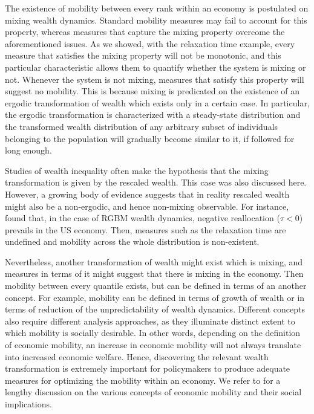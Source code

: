 \documentclass[11pt]{article}
\numberwithin{equation}{section}
\begin{document}
The existence of mobility between every rank within an economy is postulated on mixing wealth dynamics. Standard mobility measures may fail to account for this property, whereas measures that capture the mixing property overcome the aforementioned issues. As we showed, with the relaxation time example, every measure that satisfies the mixing property will not be monotonic, and this particular characteristic allows them to quantify whether the system is mixing or not. Whenever the system is not mixing, measures that satisfy this property will suggest no mobility. This is because mixing is predicated on the existence of an ergodic transformation of wealth which exists only in a certain case. In particular, the ergodic transformation is characterized with a steady-state distribution and the transformed wealth distribution of any arbitrary subset of individuals belonging to the population will gradually become similar to it, if followed for long enough.

Studies of wealth inequality often make the hypothesis that the mixing transformation is given by the rescaled wealth. This case was also discussed here. However, a growing body of evidence suggests that in reality rescaled wealth might also be a non-ergodic, and hence non-mixing observable. For instance, \citet{BermanPetersAdamou2019} found that, in the case of RGBM wealth dynamics, negative reallocation ($\tau < 0$) prevails in the US economy. Then, measures such as the relaxation time are undefined and mobility across the whole distribution is non-existent.
 
Nevertheless, another transformation of wealth might exist which is mixing, and measures in terms of it might suggest that there is mixing in the economy. Then mobility between every quantile exists, but can be defined in terms of an another concept.  For example, mobility can be defined in terms of growth of wealth or in terms of reduction of the unpredictability of wealth dynamics. Different concepts also require different analysis approaches, as they illuminate distinct extent to which mobility is socially desirable. In other words, depending on the definition of economic mobility, an increase in economic mobility will not always translate into increased economic welfare. Hence, discovering the relevant wealth transformation is extremely important for policymakers to produce adequate measures for optimizing the mobility within an economy. We refer to \citet{JanttiJenkins2015} for a lengthy discussion on the various concepts of economic mobility and their social implications.
\end{document}
